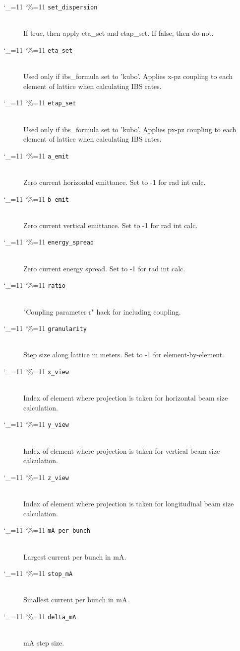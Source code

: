 \documentclass[11pt]{article}
\newcommand\ttcmd{\begingroup\catcode`\_=11 \catcode`\%=11 \dottcmd}
\newcommand\dottcmd[1]{\texttt{#1}\endgroup}
\newcommand{\vn}{\ttcmd}
\newcommand{\Newline}{\hfil \\}
\begin{document}
\begin{description}
  \item[\vn{set_dispersion}] \Newline
If true, then apply eta_set and etap_set.
If false, then do not.

  \item[\vn{eta_set}] \Newline
Used only if ibs_formula set to 'kubo'.
Applies x-pz coupling to each
element of lattice when calculating IBS rates.

  \item[\vn{etap_set}] \Newline
Used only if ibs_formula set to 'kubo'. Applies px-pz coupling to
each element of lattice when calculating IBS rates.

  \item[\vn{a_emit}] \Newline
Zero current horizontal emittance.
Set to -1 for rad int calc.

  \item[\vn{b_emit}] \Newline
Zero current vertical emittance.
Set to -1 for rad int calc.

  \item[\vn{energy_spread}] \Newline
Zero current energy spread.
Set to -1 for rad int calc.

  \item[\vn{ratio}] \Newline
"Coupling parameter r" hack for including coupling.

  \item[\vn{granularity}] \Newline
Step size along lattice in meters.
Set to -1 for element-by-element.

  \item[\vn{x_view}] \Newline
Index of element where projection is taken for horizontal beam size
calculation.

  \item[\vn{y_view}] \Newline
Index of element where projection is taken for vertical beam size
calculation.

  \item[\vn{z_view}] \Newline
Index of element where projection is taken for longitudinal beam size
calculation.

  \item[\vn{mA_per_bunch}] \Newline
Largest current per bunch in mA.

  \item[\vn{stop_mA}] \Newline
Smallest current per bunch in mA.

  \item[\vn{delta_mA}] \Newline
mA step size.

  \end{description}
\end{document}
